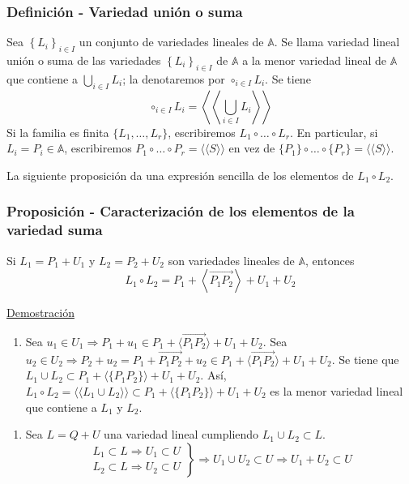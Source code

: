 \documentclass[12pt, a4paper, ones, notitlepage, openany,titlepage]{article}
\newcommand{\demostracion}{\noindent\underline{Demostración}}
\begin{document}
\subsubsection{Definición - Variedad unión o suma}
Sea $\left\{L_{i}\right\}_{i \in I}$ un conjunto de variedades lineales de $\mathbb{A}$. Se llama variedad lineal unión o suma de las variedades $\left\{L_{i}\right\}_{i \in I}$ de $\mathbb{A}$ a la menor variedad lineal de $\mathbb{A}$ que contiene a $\displaystyle \bigcup_{i \in I} L_{i}$; la denotaremos por $\circ_{i \in I} L_{i}$. Se tiene
$$
\circ_{i \in I} L_{i}=\left\langle\left\langle\bigcup_{i \in I} L_{i}\right\rangle\right\rangle
$$
Si la familia es finita $\{L_1,\ldots,L_r\}$, escribiremos $L_1 \circ \ldots \circ L_r$. En particular, si $L_i=P_i \in \mathbb{A}$, escribiremos $P_{1} \circ \ldots \circ P_{r}=\langle\langle S\rangle\rangle$ en vez de $\{P_1\} \circ \ldots \circ \{P_r\} = \langle\langle S\rangle\rangle$.

\noindent La siguiente proposición da una expresión sencilla de los elementos de $L_{1} \circ L_{2}$.

\subsubsection{Proposición - Caracterización de los elementos de la variedad suma}
Si $L_{1}=P_{1}+U_{1}$ y $L_{2}=P_{2}+U_{2}$ son variedades lineales de $\mathbb{A}$, entonces
$$
L_{1} \circ L_{2}=P_{1}+\left\langle\overrightarrow{P_{1} P_{2}}\right\rangle+U_{1}+U_{2}
$$

\demostracion

\begin{enumerate}[label=$\subset/$]
	\item Sea $u_1 \in U_1 \Longrightarrow P_1 + u_1 \in P_1 + \langle \overrightarrow{P_1 P_2} \rangle + U_1 + U_2$. Sea $u_2 \in U_2 \Longrightarrow P_2 + u_2 = P_1 + \overrightarrow{P_1 P_2} + u_2 \in P_1 + \langle \overrightarrow{P_1 P_2} \rangle + U_1 + U_2$. Se tiene que $L_1 \cup L_2 \subset P_1 + \langle \{P_1 P_2\} \rangle + U_1 + U_2$. Así, $L_1 \circ L_2 = \langle\langle L_1 \cup L_2 \rangle\rangle \subset P_1 + \langle \{P_1 P_2\} \rangle + U_1 + U_2$ es la menor variedad lineal que contiene a $L_1$ y $L_2$.
\end{enumerate}
\begin{enumerate}[label=$\supset/$]
	\item Sea $L = Q + U$ una variedad lineal cumpliendo $L_1 \cup L_2 \subset L$.
	$$
	\left. \begin{array}{r}
		L_1 \subset L \Longrightarrow U_1 \subset U \\
		L_2 \subset L \Longrightarrow U_2 \subset U
	\end{array} \right\} \Longrightarrow U_1 \cup U_2 \subset U \Longrightarrow U_1 + U_2 \subset U
	$$
\end{enumerate}
\end{document}
